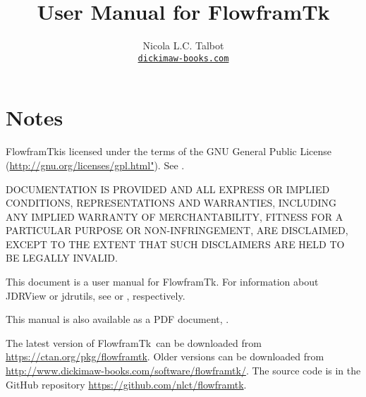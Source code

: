 
\usepackage{fontspec}
\setmainfont{Linux Libertine O}
\usepackage{verbatim}
\usepackage{longtable}
\usepackage{booktabs}
\usepackage
 [
    novref,
 ]{texjavahelp}

\hypersetup{colorlinks,linkcolor=blue}

\newcommand{\appname}{FlowframTk}

\title{User Manual for \appname}
\author{Nicola L.C. Talbot\\\href{https://www.dickimaw-books.com/}{\nolinkurl{dickimaw-books.com}}}


\GlsXtrLoadResources[src={flowframtk,\langbibsrcs},
 \TeXJavaHelpSymbolResourceOptions
]

\GlsXtrLoadResources[src={flowframtk,\langbibsrcs},
 \TeXJavaHelpGlsResourceOptions
]


\maketitle
\frontmatter
\tableofcontents
\listoffigures

\chapter*{Notes}

\appname is licensed under the terms of the GNU General Public License
(\url{http://gnu.org/licenses/gpl.html"}).
See .

DOCUMENTATION IS PROVIDED  AND ALL EXPRESS OR IMPLIED
CONDITIONS, REPRESENTATIONS AND WARRANTIES, INCLUDING ANY
IMPLIED WARRANTY OF MERCHANTABILITY, FITNESS FOR A PARTICULAR
PURPOSE OR NON-INFRINGEMENT, ARE DISCLAIMED, EXCEPT TO THE EXTENT THAT
SUCH DISCLAIMERS ARE HELD TO BE LEGALLY INVALID.

This document is a user manual for \appname. For information about
JDRView or jdrutils, see  or
, respectively.

\IfTeXParserLib
  {%
    This manual is also available as a PDF document, . 
  }
  {}

The latest version of \appname\ can be downloaded from
\url{https://ctan.org/pkg/flowframtk}.
Older versions can be downloaded from
\url{http://www.dickimaw-books.com/software/flowframtk/}.
The source code is in the GitHub repository
\url{https://github.com/nlct/flowframtk}.

